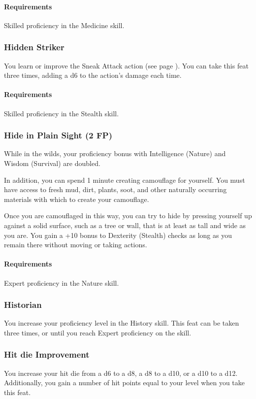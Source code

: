     \paragraph{Requirements} Skilled proficiency in the Medicine skill.
\subsubsection{Hidden Striker} \label{feat::hiddenstriker}
    You learn or improve the Sneak Attack action (see page \pageref{act::sneakattack}).
    You can take this feat three times, adding a d6 to the action's damage each time.
    \paragraph{Requirements} Skilled proficiency in the Stealth skill.
\subsubsection{Hide in Plain Sight (2 FP)} \label{feat::hideinplainsight}
    While in the wilds, your proficiency bonus with Intelligence (Nature) and Wisdom (Survival) are doubled.

    In addition, you can spend 1 minute creating camouflage for yourself.
    You must have access to fresh mud, dirt, plants, soot, and other naturally occurring materials with which to create your camouflage.

    Once you are camouflaged in this way, you can try to hide by pressing yourself up against a solid surface, such as a tree or wall, that is at least as tall and wide as you are.
    You gain a +10 bonus to Dexterity (Stealth) checks as long as you remain there without moving or taking actions.
    \paragraph{Requirements} Expert proficiency in the Nature skill.
\subsubsection{Historian} \label{feat::historian}
    You increase your proficiency level in the History skill.
    This feat can be taken three times, or until you reach Expert proficiency on the skill.
\subsubsection{Hit die Improvement} \label{feat::hitdieimprovement}
    You increase your hit die from a d6 to a d8, a d8 to a d10, or a d10 to a d12.
    Additionally, you gain a number of hit points equal to your level when you take this feat.

